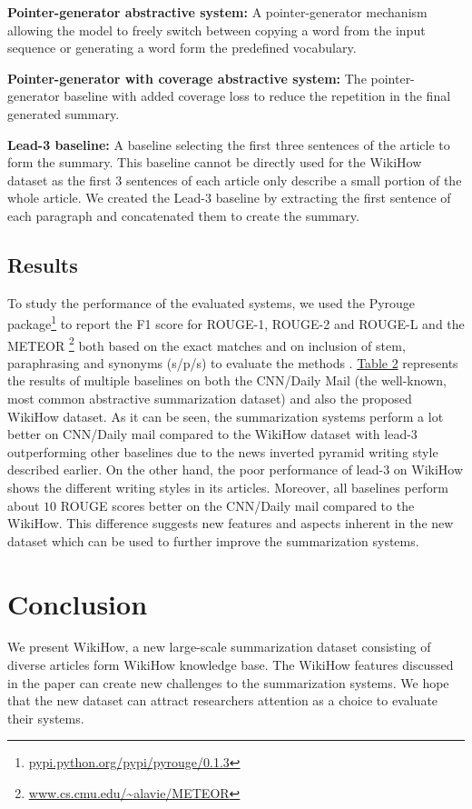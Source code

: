 \documentclass[11pt,a4paper]{article}
\begin{document}
\noindent\textbf{Pointer-generator abstractive system:} A pointer-generator mechanism \cite{see2017get} allowing the model to freely switch between copying a word from the input sequence or generating a word form the predefined vocabulary. 

\noindent\textbf{Pointer-generator with coverage abstractive system:} The pointer-generator baseline with added coverage loss \cite{see2017get} to reduce the repetition in the final generated summary.

\noindent\textbf{Lead-3 baseline:} A baseline selecting the first three sentences of the article to form the summary. 
This baseline cannot be directly used for the WikiHow dataset as the first $3$ sentences of each article only describe a small portion of the whole article. We created the Lead-3 baseline by extracting the first sentence of each paragraph and concatenated them to create the summary.



\subsection{Results}
To study the performance of the evaluated systems, we used the Pyrouge package\footnote{\url{pypi.python.org/pypi/pyrouge/0.1.3}} to report the F1 score for ROUGE-1, ROUGE-2 and ROUGE-L \cite{lin2004rouge} and the METEOR \cite{banerjee2005meteor}\footnote{\url{www.cs.cmu.edu/~alavie/METEOR}} both based on the exact matches and on inclusion of stem, paraphrasing and synonyms (s/p/s) to evaluate the methods . \hyperref[results]{Table 2} represents the results of multiple baselines on both the CNN/Daily Mail (the well-known, most common abstractive summarization dataset) and also the proposed WikiHow dataset. As it can be seen, the summarization systems perform a lot better on CNN/Daily mail compared to the WikiHow dataset with lead-3 outperforming other baselines due to the news inverted pyramid writing style described earlier. On the other hand, the poor performance of lead-3 on WikiHow shows the different writing styles in its articles. Moreover, all baselines perform about $10$ ROUGE scores better on the CNN/Daily mail compared to the WikiHow. This difference suggests new features and aspects inherent in the new dataset which can be used to further improve the summarization systems. 
\section{Conclusion}
We present WikiHow, a new large-scale summarization dataset consisting of diverse articles 
form WikiHow knowledge base. The WikiHow features discussed in the paper can create new challenges to the summarization systems. We hope that the new dataset can attract researchers attention as a choice to evaluate their systems. 


\end{document}
